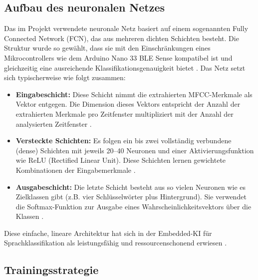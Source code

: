 \subsection{Aufbau des neuronalen Netzes} \label{sec:Aufbau des neuronalen Netzes}

Das im Projekt verwendete neuronale Netz basiert auf einem sogenannten Fully Connected Network (FCN), das aus mehreren dichten Schichten besteht. Die Struktur wurde so gewählt, dass sie mit den Einschränkungen eines Mikrocontrollers wie dem Arduino Nano 33 BLE Sense kompatibel ist und gleichzeitig eine ausreichende Klassifikationsgenauigkeit bietet \cite{EdgeImpulse:2025LearningBlocks}.
Das Netz setzt sich typischerweise wie folgt zusammen:

\begin{itemize}
    \item \textbf{Eingabeschicht:} Diese Schicht nimmt die extrahierten MFCC-Merkmale als Vektor entgegen. Die Dimension dieses Vektors entspricht der Anzahl der extrahierten Merkmale pro Zeitfenster multipliziert mit der Anzahl der analysierten Zeitfenster \cite{TensorFlowKerasTraining:2025}.
    
    \item \textbf{Versteckte Schichten:} Es folgen ein bis zwei vollständig verbundene (dense) Schichten mit jeweils 20–40 Neuronen und einer Aktivierungsfunktion wie ReLU (Rectified Linear Unit). Diese Schichten lernen gewichtete Kombinationen der Eingabemerkmale \cite{TensorFlowKerasTraining:2025}.
    
    \item \textbf{Ausgabeschicht:} Die letzte Schicht besteht aus so vielen Neuronen wie es Zielklassen gibt (z.B. vier Schlüsselwörter plus Hintergrund). Sie verwendet die Softmax-Funktion zur Ausgabe eines Wahrscheinlichkeitsvektors über die Klassen \cite{TensorFlowKerasTraining:2025}.
\end{itemize}

Diese einfache, lineare Architektur hat sich in der Embedded-KI für Sprachklassifikation als leistungsfähig und ressourcenschonend erwiesen \cite{EdgeImpulse:2025LearningBlocks}.

\subsection{Trainingsstrategie}

